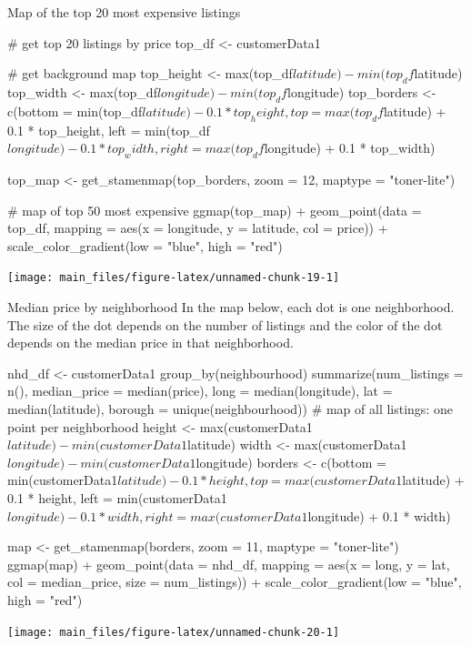 Map of the top 20 most expensive listings

\begin{Schunk}
\begin{Sinput}
# get top 20 listings by price
top_df <- customerData1 %

# get background map
top_height <- max(top_df$latitude) - min(top_df$latitude)
top_width <- max(top_df$longitude) - min(top_df$longitude)
top_borders <- c(bottom  = min(top_df$latitude)  - 0.1 * top_height,
                 top     = max(top_df$latitude)  + 0.1 * top_height,
                 left    = min(top_df$longitude) - 0.1 * top_width,
                 right   = max(top_df$longitude) + 0.1 * top_width)

top_map <- get_stamenmap(top_borders, zoom = 12, maptype = "toner-lite")

# map of top 50 most expensive
ggmap(top_map) +
    geom_point(data = top_df, mapping = aes(x = longitude, y = latitude,
                                        col = price)) +
    scale_color_gradient(low = "blue", high = "red")
\end{Sinput}


\begin{center}\texttt{[image: main\_files/figure-latex/unnamed-chunk-19-1]} \end{center}

\end{Schunk}

Median price by neighborhood In the map below, each dot is one
neighborhood. The size of the dot depends on the number of listings and
the color of the dot depends on the median price in that neighborhood.

\begin{Schunk}
\begin{Sinput}
nhd_df <- customerData1 %
    group_by(neighbourhood) %
    summarize(num_listings = n(),
              median_price = median(price),
              long = median(longitude),
              lat = median(latitude),
              borough = unique(neighbourhood))
# map of all listings: one point per neighborhood
height <- max(customerData1$latitude) - min(customerData1$latitude)
width <- max(customerData1$longitude) - min(customerData1$longitude)
borders <- c(bottom  = min(customerData1$latitude)  - 0.1 * height,
             top     = max(customerData1$latitude)  + 0.1 * height,
             left    = min(customerData1$longitude) - 0.1 * width,
             right   = max(customerData1$longitude) + 0.1 * width)

map <- get_stamenmap(borders, zoom = 11, maptype = "toner-lite")
ggmap(map) +
    geom_point(data = nhd_df, mapping = aes(x = long, y = lat,
                                            col = median_price, size = num_listings)) +
    scale_color_gradient(low = "blue", high = "red")
\end{Sinput}


\begin{center}\texttt{[image: main\_files/figure-latex/unnamed-chunk-20-1]} \end{center}

\end{Schunk}

